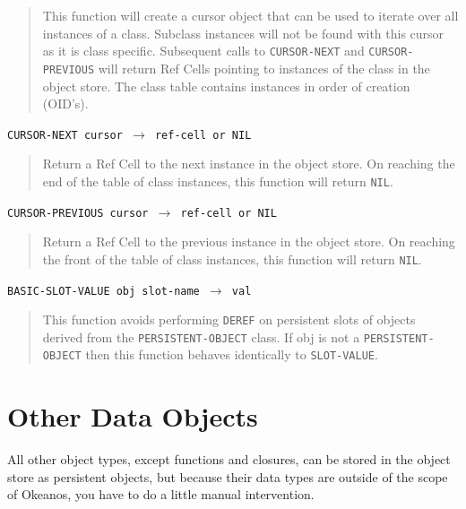 \documentclass[article,oneside]{memoir}
\begin{document}
\begin{quote}
This function will create a cursor object that can be used to iterate over all instances of a class. Subclass instances will not be found with this cursor as it is class specific. Subsequent calls to \texttt{CURSOR-NEXT} and \texttt{CURSOR-PREVIOUS} will return Ref Cells pointing to instances  of the class in the object store. The class table contains instances in order of creation (OID's).
\end{quote}

\noindent \texttt{CURSOR-NEXT cursor $\rightarrow$ ref-cell or NIL}

\begin{quote}
Return a Ref Cell to the next instance in the object store. On reaching the end of the table of class instances, this function will return \texttt{NIL}.
\end{quote}

\noindent \texttt{CURSOR-PREVIOUS cursor $\rightarrow$ ref-cell or NIL}

\begin{quote}
Return a Ref Cell to the previous instance in the object store. On reaching the front of the table of class instances, this function will return \texttt{NIL}.
\end{quote}

 \noindent \texttt{BASIC-SLOT-VALUE obj slot-name $\rightarrow$ val}

\begin{quote}
This function avoids performing \texttt{DEREF} on persistent slots of objects derived from the \texttt{PERSISTENT-OBJECT} class. If obj is not a \texttt{PERSISTENT-OBJECT} then this function behaves identically to \texttt{SLOT-VALUE}.
\end{quote}



\chapter{Other Data Objects}
All other object types, except functions and closures, can be stored in the object store as persistent objects, but because their data types are outside of the scope of Okeanos, you have to do a little manual intervention.
\\
\end{document}
